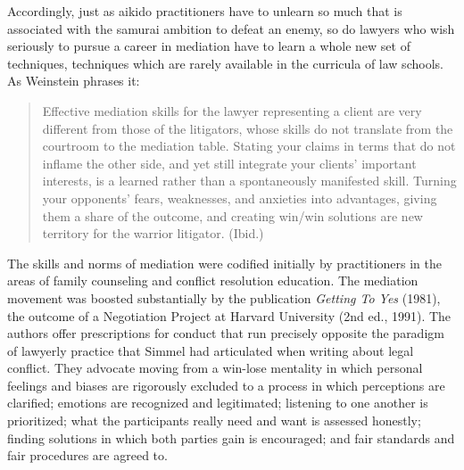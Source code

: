 Accordingly, just as aikido practitioners have to unlearn so much that is associated with the samurai ambition to defeat an enemy, so do lawyers who wish seriously to pursue a career in mediation have to learn a whole new set of techniques, techniques which are rarely available in the curricula of law schools. As Weinstein phrases it:

\begin{quote}
Effective mediation skills for the lawyer representing a client are very different from those of the litigators, whose skills do not translate from the courtroom to the mediation table. Stating your claims in terms that do not inflame the other side, and yet still integrate your clients' important interests, is a learned rather than a spontaneously manifested skill. Turning your opponents' fears, weaknesses, and anxieties into advantages, giving them a share of the outcome, and creating win/win solutions are new territory for the warrior litigator. (Ibid.)
\end{quote}

The skills and norms of mediation were codified initially by practitioners in the areas of family counseling and conflict resolution education. The mediation movement was boosted substantially by the publication \emph{Getting To Yes} (1981), the outcome of a Negotiation Project at Harvard University (2nd ed., 1991). The authors offer prescriptions for conduct that run precisely opposite the paradigm of lawyerly practice that Simmel had articulated when writing about legal conflict. They advocate moving from a win-lose mentality in which personal feelings and biases are rigorously excluded to a process in which perceptions are clarified; emotions are recognized and legitimated; listening to one another is prioritized; what the participants really need and want is assessed honestly; finding solutions in which both parties gain is encouraged; and fair standards and fair procedures are agreed to. 

